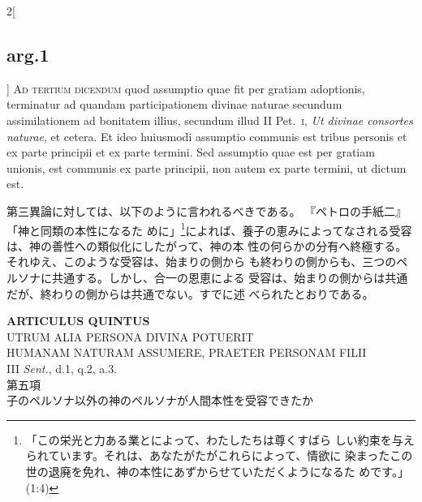 \documentclass[paper=a4paper,fontsize=10pt,jafontsize=9pt,titlepage]{jlreq}
\begin{document}
\begin{paracol}{2}[\subsection{arg.1}]
{\scshape Ad tertium dicendum} quod assumptio quae fit per gratiam adoptionis,
terminatur ad quandam participationem divinae naturae secundum
assimilationem ad bonitatem illius, secundum illud II Pet.~{\scshape i}, {\itshape Ut divinae
consortes naturae}, et cetera. Et ideo huiusmodi assumptio communis est
tribus personis et ex parte principii et ex parte termini. Sed assumptio
quae est per gratiam unionis, est communis ex parte principii, non autem
ex parte termini, ut dictum est.

\switchcolumn

第三異論に対しては、以下のように言われるべきである。
『ペトロの手紙二』「神と同類の本性になるた
 めに」\footnote{「この栄光と力ある業とによって、わたしたちは尊くすばら
 しい約束を与えられています。それは、あなたがたがこれらによって、情欲に
 染まったこの世の退廃を免れ、神の本性にあずからせていただくようになるた
 めです。」(1:4)}によれば、養子の恵みによってなされる受容は、神の善性への類似化にしたがって、神の本
 性の何らかの分有へ終極する。それゆえ、このような受容は、始まりの側から
 も終わりの側からも、三つのペルソナに共通する。しかし、合一の恩恵による
 受容は、始まりの側からは共通だが、終わりの側からは共通でない。すでに述
 べられたとおりである。

\end{paracol}
\newpage
{}
{}
\setcounter{section}{5}
\setcounter{subsection}{0}







\begin{center}
 {\Large {\bfseries ARTICULUS QUINTUS}}\\
 {\large UTRUM ALIA PERSONA DIVINA POTUERIT\\HUMANAM NATURAM ASSUMERE,
 PRAETER PERSONAM FILII}\\
 {\footnotesize III {\itshape Sent.}, d.1, q.2, a.3.}\\
 {\Large 第五項\\子のペルソナ以外の神のペルソナが人間本性を受容できたか}
\end{center}
\end{document}
